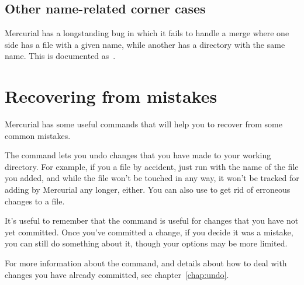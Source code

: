 \subsection{Other name-related corner cases}

Mercurial has a longstanding bug in which it fails to handle a merge
where one side has a file with a given name, while another has a
directory with the same name.  This is documented as~.

\section{Recovering from mistakes}

Mercurial has some useful commands that will help you to recover from
some common mistakes.

The  command lets you undo changes that you have made to
your working directory.  For example, if you  a file by
accident, just run  with the name of the file you added,
and while the file won't be touched in any way, it won't be tracked
for adding by Mercurial any longer, either.  You can also use
 to get rid of erroneous changes to a file.

It's useful to remember that the  command is useful for
changes that you have not yet committed.  Once you've committed a
change, if you decide it was a mistake, you can still do something
about it, though your options may be more limited.

For more information about the  command, and details
about how to deal with changes you have already committed, see
chapter~\ref{chap:undo}.

